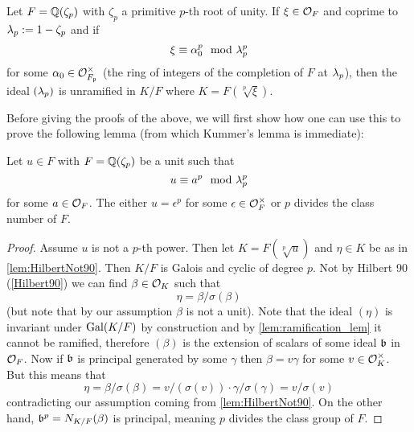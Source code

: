 \begin{lemma}\label{lem:ramification_lem}
	Let $F=\mathbb{Q}(\zeta_p)$ with $\zeta_p$ a primitive $p$-th root of unity. If $\xi \in \mathcal{O}_F$ and coprime to $\lambda_p:=1-\zeta_p$ and if \[\xi \equiv \alpha_0^p \mod {\lambda}_p^p  \] for some $\alpha_0 \in \mathcal{O}_{F_{\mathfrak{p}}}^\times$ (the ring of integers of the completion of $F$ at $\lambda_p$), then the ideal $(\lambda_p)$ is unramified in $K/F$ where $K=F(\sqrt[p]{\xi})$.
\end{lemma}

Before giving the proofs of the above, we will first show how one can use this to prove the following lemma (from which Kummer's lemma is immediate):

\begin{lemma}\label{Kummer_alt}
Let $u \in F$ with $F=\mathbb{Q}(\zeta_p)$ be a unit such that \[u \equiv a^p \mod {\lambda}_p^p\] for some $a \in \mathcal{O}_F$. The either $u = \epsilon^p$ for some $\epsilon \in \mathcal{O}_F^\times$ or $p$ divides the class number of $F$.
	
\end{lemma}

\begin{proof}
	Assume $u$ is not a $p$-th power. Then let $K=F(\sqrt[p]{u})$  and $\eta \in K$ be as in \ref{lem:HilbertNot90}. Then $K/F$ is Galois and cyclic of degree $p$. Not by Hilbert 90 (\ref{Hilbert90})  we can find $\beta \in \mathcal{O}_K$ such that \[\eta = \beta/\sigma(\beta)\] (but note that by our assumption $\beta$ is not a unit). Note that the ideal $(\eta)$ is invariant under $\operatorname{Gal}(K/F)$ by construction and by \ref{lem:ramification_lem} it cannot be ramified, therefore $(\beta)$ is the extension of scalars of some ideal $\mathfrak{b}$ in $\mathcal{O}_F$. Now if $\mathfrak{b}$ is principal generated by some $\gamma$ then $\beta=v \gamma$  for some $v \in \mathcal{O}_K^\times$. But this means that \[\eta = \beta/\sigma(\beta)= v/(\sigma(v)) \cdot \gamma / \sigma(\gamma)=v/\sigma(v)  \] contradicting our assumption coming from \ref{lem:HilbertNot90}. On the other hand, $\mathfrak{b}^p= N_{K/F}(\beta)$ is principal, meaning $p$ divides the class group of $F$.
	
	
		
	
	
\end{proof}


